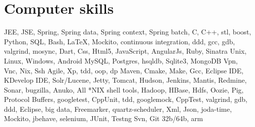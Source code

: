 %
%
%
%



\section{Computer skills}

    {JEE, JSE, Spring, Spring data, Spring context, Spring batch, C, C++, stl,
    boost, Python, SQL, Bash, \LaTeX, Mockito, continuous integration, ddd, gcc,
    gdb, valgrind, mosync, Dart, Css, Html5, JavaScript, AngularJs, Ruby,
    Sinatra} {}{}{}{}
    {Unix, Linux, Windows, Android}
    {}{}{}{}
    {MySQL, Postgres, hsqldb, Sqlite3, MongoDB}
    {}{}{}{}
    {Vpn, Vnc, Nix, Ssh}
    {}{}{}{}
    {Agile, Xp, tdd, oop, dp}
    {}{}{}{}
    {Maven, Cmake, Make, Gcc, Eclipse IDE, KDevelop IDE, Solr/Lucene,
    Jetty, Tomcat, Hudson, Jenkins, Mantis, Redmine,
    Sonar, bugzilla, Anuko, All *NIX shell tools, Hadoop, HBase, Hdfs, Oozie, Pig,
    Protocol Buffers, googletest, CppUnit, tdd, googlemock, CppTest, valgrind, gdb,
    ddd, Eclipse, big data, Freemarker, quartz-scheduler, Xml, Json, joda-time,
    Mockito, jbehave, selenium, JUnit, Testng} {}{}{}{}
    {Svn, Git}
    {}{}{}{}
    {32b/64b, arm}
    {}{}{}{}
